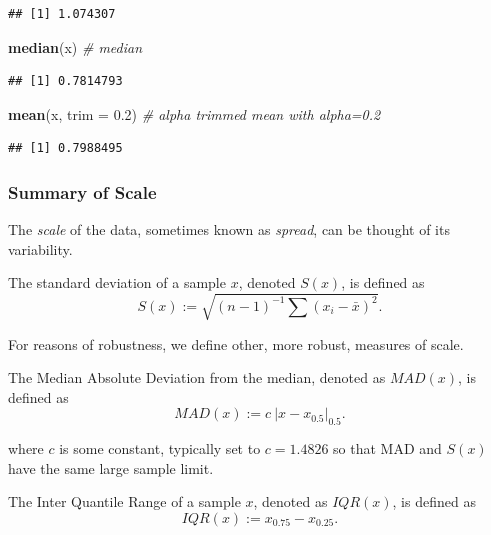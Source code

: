 \documentclass[]{book}
\newenvironment{Shaded}{\begin{snugshade}}{\end{snugshade}}
\newcommand{\KeywordTok}[1]{\textcolor[rgb]{0.13,0.29,0.53}{\textbf{#1}}}
\newcommand{\DataTypeTok}[1]{\textcolor[rgb]{0.13,0.29,0.53}{#1}}
\newcommand{\FloatTok}[1]{\textcolor[rgb]{0.00,0.00,0.81}{#1}}
\newcommand{\CommentTok}[1]{\textcolor[rgb]{0.56,0.35,0.01}{\textit{#1}}}
\newcommand{\NormalTok}[1]{#1}
\theoremstyle{definition}
\theoremstyle{definition}
\theoremstyle{definition}
\theoremstyle{remark}
\let\BeginKnitrBlock\begin \let\EndKnitrBlock\end
\begin{document}
\begin{verbatim}
## [1] 1.074307
\end{verbatim}

\begin{Shaded}
\begin{Highlighting}[]
\KeywordTok{median}\NormalTok{(x) }\CommentTok{# median}
\end{Highlighting}
\end{Shaded}

\begin{verbatim}
## [1] 0.7814793
\end{verbatim}

\begin{Shaded}
\begin{Highlighting}[]
\KeywordTok{mean}\NormalTok{(x, }\DataTypeTok{trim =} \FloatTok{0.2}\NormalTok{) }\CommentTok{# alpha trimmed mean with alpha=0.2}
\end{Highlighting}
\end{Shaded}

\begin{verbatim}
## [1] 0.7988495
\end{verbatim}

\subsubsection{Summary of Scale}\label{summary-of-scale}

The \emph{scale} of the data, sometimes known as \emph{spread}, can be
thought of its variability.

\BeginKnitrBlock{definition}[Standard Deviation]
\protect\hypertarget{def:unnamed-chunk-75}{}{\label{def:unnamed-chunk-75}
{} }The standard deviation of a sample
\(x\), denoted \(S(x)\), is defined as
\[ S(x):=\sqrt{(n-1)^{-1} \sum (x_i-\bar x)^2} . \]
\EndKnitrBlock{definition}

For reasons of robustness, we define other, more robust, measures of
scale.

\BeginKnitrBlock{definition}[MAD]
\protect\hypertarget{def:unnamed-chunk-76}{}{\label{def:unnamed-chunk-76}
{} }The Median Absolute Deviation from the median,
denoted as \(MAD(x)\), is defined as
\[MAD(x):= c \: |x-x_{0.5}|_{0.5} . \]
\EndKnitrBlock{definition}

where \(c\) is some constant, typically set to \(c=1.4826\) so that MAD
and \(S(x)\) have the same large sample limit.

\BeginKnitrBlock{definition}[IQR]
\protect\hypertarget{def:unnamed-chunk-77}{}{\label{def:unnamed-chunk-77}
{} }The Inter Quantile Range of a sample \(x\),
denoted as \(IQR(x)\), is defined as \[ IQR(x):= x_{0.75}-x_{0.25} .\]
\EndKnitrBlock{definition}
\end{document}
